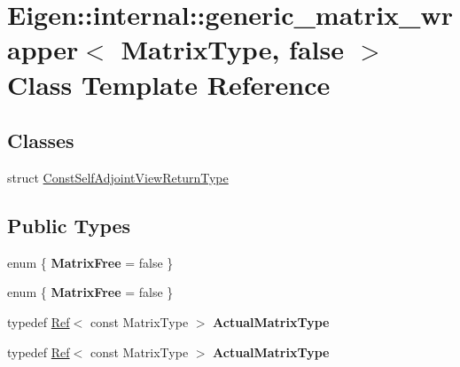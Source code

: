 \hypertarget{class_eigen_1_1internal_1_1generic__matrix__wrapper_3_01_matrix_type_00_01false_01_4}{}\section{Eigen\+:\+:internal\+:\+:generic\+\_\+matrix\+\_\+wrapper$<$ Matrix\+Type, false $>$ Class Template Reference}
\label{class_eigen_1_1internal_1_1generic__matrix__wrapper_3_01_matrix_type_00_01false_01_4}
\subsection*{Classes}
\begin{DoxyCompactItemize}
\item 
struct \hyperlink{struct_eigen_1_1internal_1_1generic__matrix__wrapper_3_01_matrix_type_00_01false_01_4_1_1_const_self_adjoint_view_return_type}{Const\+Self\+Adjoint\+View\+Return\+Type}
\end{DoxyCompactItemize}
\subsection*{Public Types}
\begin{DoxyCompactItemize}
\item 
\mbox{\label{class_eigen_1_1internal_1_1generic__matrix__wrapper_3_01_matrix_type_00_01false_01_4_a63ec345e0e64ab83d3473b5b2d641a19}} 
enum \{ {\bfseries Matrix\+Free} = false
 \}
\item 
\mbox{\label{class_eigen_1_1internal_1_1generic__matrix__wrapper_3_01_matrix_type_00_01false_01_4_ac7457fbea0846b028b8a2c8ace710309}} 
enum \{ {\bfseries Matrix\+Free} = false
 \}
\item 
\mbox{\label{class_eigen_1_1internal_1_1generic__matrix__wrapper_3_01_matrix_type_00_01false_01_4_a70553e46f5c9ca4752cba6f13823f68f}} 
typedef \hyperlink{group___core___module_class_eigen_1_1_ref}{Ref}$<$ const Matrix\+Type $>$ {\bfseries Actual\+Matrix\+Type}
\item 
\mbox{\label{class_eigen_1_1internal_1_1generic__matrix__wrapper_3_01_matrix_type_00_01false_01_4_a70553e46f5c9ca4752cba6f13823f68f}} 
typedef \hyperlink{group___core___module_class_eigen_1_1_ref}{Ref}$<$ const Matrix\+Type $>$ {\bfseries Actual\+Matrix\+Type}
\end{DoxyCompactItemize}

